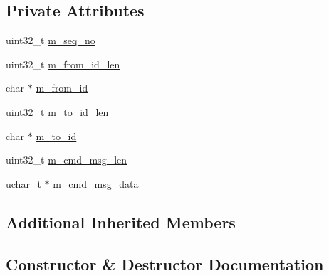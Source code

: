 \subsection*{Private Attributes}
\begin{DoxyCompactItemize}
\item 
uint32\+\_\+t \hyperlink{class_c_im_pdu_client_p2_p_cmd_msg_acc7ed3583211009dfbfd726a6b9c2033}{m\+\_\+seq\+\_\+no}
\item 
uint32\+\_\+t \hyperlink{class_c_im_pdu_client_p2_p_cmd_msg_a794cdcfa94da3bc1dfaf1598cf7d746e}{m\+\_\+from\+\_\+id\+\_\+len}
\item 
char $\ast$ \hyperlink{class_c_im_pdu_client_p2_p_cmd_msg_a9ddd11544951f8e55bde81e032a426d5}{m\+\_\+from\+\_\+id}
\item 
uint32\+\_\+t \hyperlink{class_c_im_pdu_client_p2_p_cmd_msg_a372b995a9bd48c05767aeff25ebf4613}{m\+\_\+to\+\_\+id\+\_\+len}
\item 
char $\ast$ \hyperlink{class_c_im_pdu_client_p2_p_cmd_msg_a4ede4105b2e44d49a06034290fd05330}{m\+\_\+to\+\_\+id}
\item 
uint32\+\_\+t \hyperlink{class_c_im_pdu_client_p2_p_cmd_msg_ab8a6e06d23781d5d732b8ad2deb99e30}{m\+\_\+cmd\+\_\+msg\+\_\+len}
\item 
\hyperlink{base_2ostype_8h_a124ea0f8f4a23a0a286b5582137f0b8d}{uchar\+\_\+t} $\ast$ \hyperlink{class_c_im_pdu_client_p2_p_cmd_msg_a9984edac7532665ade634d0a32ea56e5}{m\+\_\+cmd\+\_\+msg\+\_\+data}
\end{DoxyCompactItemize}
\subsection*{Additional Inherited Members}


\subsection{Constructor \& Destructor Documentation}
\hypertarget{class_c_im_pdu_client_p2_p_cmd_msg_a79bd98286f45001f0b6c77da2b2a4f24}{}
